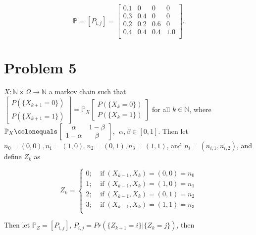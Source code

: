 \documentclass[12pt]{article}
\newcommand{\nats}[0] { \mathbb{N}}
\newcommand{\Om}[0] { \Omega }
\newcommand{\IF}[0] { \; \textrm{if} \; }
\newcommand{\rarw}[0] { \rightarrow }
\newcommand{ \defeq }[0] { \colonequals }
\newcommand{ \cf }[1] { \mathbf{1}_{#1} }
\begin{document}
$$
\mathbb{P} = [P_{i,j}] = \left[ \begin{array}{cccc} 
0.1  & 0  & 0 & 0 \\
0.3 & 0.4 & 0  & 0  \\
0.2 & 0.2 & 0.6 & 0 \\
0.4 & 0.4 & 0.4 & 1.0    \\
\end{array} \right].
$$










\section*{Problem 5}




$X: \nats \times \Om \rarw \nats$ a markov chain such that $ \left[ \begin{array}{c} P( \{ X_{k+1} = 0 \} ) \\ P( \{ X_{k+1} =1 \} ) \end{array} \right]  = \mathbb{P}_X \left[ \begin{array}{c} P( \{ X_{k} = 0 \} ) \\ P( \{ X_{k} =1 \} ) \end{array} \right] $ for all $k \in \nats$, where $ \mathbb{P}_X \defeq \left[ \begin{array}{cc} \alpha & 1-\beta \\ 1-\alpha & \beta \end{array} \right]$, $ \; \alpha, \beta \in [0,1]$. Then let $n_0 = (0,0), n_1= (1,0), n_2 = (0,1), n_3 = (1,1)$, and $n_i = (n_{i,1}, n_{i,2})$, and define $Z_k$ as


$$
 Z_k = \left \{ \begin{array}{c}   
 0; \; \; \; \IF  (X_{k-1}, X_k) = (0,0) = n_0  \\   
 1; \; \; \; \IF  (X_{k-1}, X_k) = (1,0) = n_1  \\ 
 2; \; \; \; \IF  (X_{k-1}, X_k) = (0,1) = n_2  \\ 
 3; \; \; \; \IF  (X_{k-1}, X_k) = (1,1) = n_3  \\     \end{array} \right.
$$

\noindent
Then let $\mathbb{P}_Z = [ P_{i,j} ]$, $P_{i,j} = Pr( \{ Z_{k+1} = i \} | \{ Z_{k} = j  \} )$, then
\end{document}
